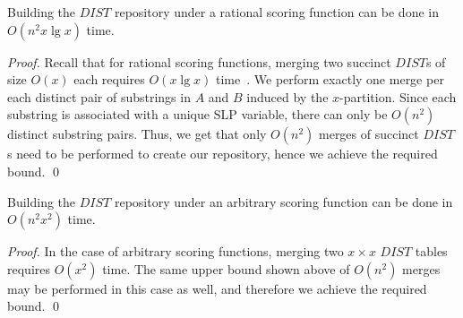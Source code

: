 \begin{lemma}
\label{Lemma: dist repository rational}Building the $DIST$ repository under a rational scoring function
can be done in $O(n^2x\lg x)$ time.
\end{lemma}
\begin{proof}
Recall that for rational scoring functions, merging two
succinct $DIST$s of size $O(x)$ each requires $O(x \lg x)$
time~\cite{Tiskin2009}. We perform exactly one merge per each
distinct pair of substrings in $A$ and $B$ induced by the
$x$-partition. Since each substring is associated with a unique
SLP variable, there can only be $O(n^2)$ distinct
substring pairs. Thus, we get that only $O(n^2)$ merges of
succinct $DIST$s need to be performed to create our
repository, hence we achieve the required bound. \qed
\end{proof}

\begin{lemma}
\label{Lemma: dist repository arbitrary}Building the $DIST$ repository under an arbitrary scoring
function can be done in $O(n^2x^2)$ time.
\end{lemma}
\begin{proof}
In the case of arbitrary scoring functions, merging two
$x\times x$ $DIST$ tables requires $O(x^2)$ time. The same
upper bound shown above of $O(n^2)$ merges may be performed in
this case as well, and therefore we achieve the required bound.
\qed
\end{proof}

